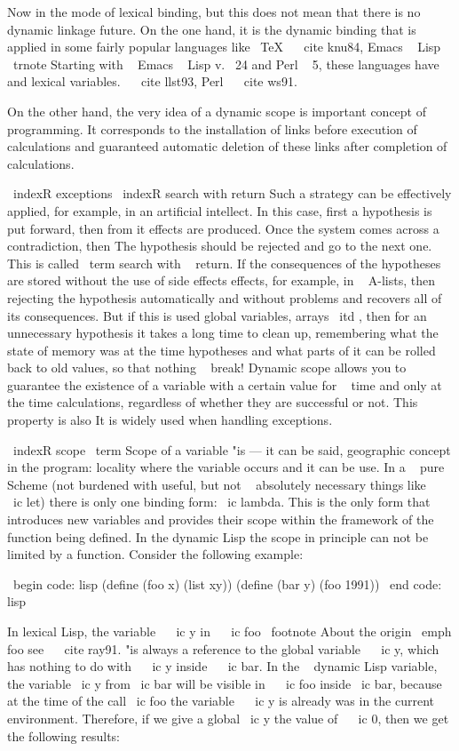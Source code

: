 {{Now in the mode of lexical binding, but this does not mean that there is no dynamic linkage
future. On the one hand, it is the dynamic binding that is applied
in some fairly popular languages ​​like \ TeX ~ \ cite {knu84},
Emacs ~ Lisp \ trnote {Starting with ~ Emacs ~ Lisp v. \, 24 and Perl ~ 5, these languages ​​have and
lexical variables.} ~ \ cite {llst93}, Perl ~ \ cite {ws91}.

On the other hand, the very idea of ​​a dynamic scope is important
concept of programming. It corresponds to the installation of links before
execution of calculations and guaranteed automatic deletion of these links
after completion of calculations.

\ indexR {exceptions}
\ indexR {search with return}
Such a strategy can be effectively applied, for example, in an artificial
intellect. In this case, first a hypothesis is put forward, then from it
effects are produced. Once the system comes across a contradiction, then
The hypothesis should be rejected and go to the next one. This is called \ term {search
with ~ return}. If the consequences of the hypotheses are stored without the use of side effects
effects, for example, in ~ A-lists, then rejecting the hypothesis automatically and without
problems and recovers all of its consequences. But if this is used
global variables, arrays { \ itd }, then for an unnecessary hypothesis
it takes a long time to clean up, remembering what the state of memory was at the time
hypotheses and what parts of it can be rolled back to old values, so that
nothing ~ break! Dynamic scope allows you to guarantee
the existence of a variable with a certain value for ~ time and only at the time
calculations, regardless of whether they are successful or not. This property is also
It is widely used when handling exceptions.

\ indexR {scope}
\ term {Scope} of a variable "is --- it can be said, geographic
concept in the program: locality where the variable occurs and it can be
use. In a ~ pure Scheme (not burdened with useful, but not ~ absolutely
necessary things like ~ \ ic {let}) there is only one binding form:
\ ic {lambda}. This is the only form that introduces new variables and provides
their scope within the framework of the function being defined. In the dynamic Lisp
the scope in principle can not be limited by a function. Consider
the following example:

\ begin {code: lisp}
(define (foo x) (list xy))
(define (bar y) (foo 1991))
\ end {code: lisp}

In lexical Lisp, the variable ~ \ ic {y} in ~ \ ic {foo} \ footnote {About the origin
\ emph {foo} see ~ \ cite {ray91}.} "is always a reference to the global
variable ~ \ ic {y}, which has nothing to do with ~ \ ic {y} inside ~ \ ic {bar}.
In the ~ dynamic Lisp variable, the variable \ ic {y} from \ ic {bar} will be visible in ~ \ ic {foo}
inside \ ic {bar}, because at the time of the call \ ic {foo} the variable ~ \ ic {y} is already
was in the current environment. Therefore, if we give a global \ ic {y}
the value of ~ \ ic {0}, then we get the following results:

}}
